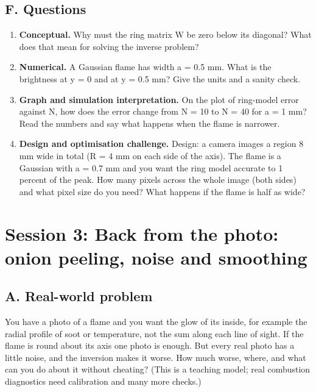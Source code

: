 \documentclass[11pt,a4paper]{article}
\begin{document}
\subsection*{F. Questions}
\begin{enumerate}[nosep]
\item \textbf{Conceptual.} Why must the ring matrix W be zero below its diagonal? What does that mean for solving the inverse problem?
\item \textbf{Numerical.} A Gaussian flame has width a = 0.5 mm. What is the brightness at y = 0 and at y = 0.5 mm? Give the units and a sanity check.
\item \textbf{Graph and simulation interpretation.} On the plot of ring-model error against N, how does the error change from N = 10 to N = 40 for a = 1 mm? Read the numbers and say what happens when the flame is narrower.
\item \textbf{Design and optimisation challenge.} Design: a camera images a region 8 mm wide in total (R = 4 mm on each side of the axis). The flame is a Gaussian with a = 0.7 mm and you want the ring model accurate to 1 percent of the peak. How many pixels across the whole image (both sides) and what pixel size do you need? What happens if the flame is half as wide?
\end{enumerate}

\section{Session 3: Back from the photo: onion peeling, noise and smoothing}

\subsection*{A. Real-world problem}
You have a photo of a flame and you want the glow of its inside, for example the radial profile of soot or temperature, not the sum along each line of sight. If the flame is round about its axis one photo is enough. But every real photo has a little noise, and the inversion makes it worse. How much worse, where, and what can you do about it without cheating? (This is a teaching model; real combustion diagnostics need calibration and many more checks.)
\end{document}
